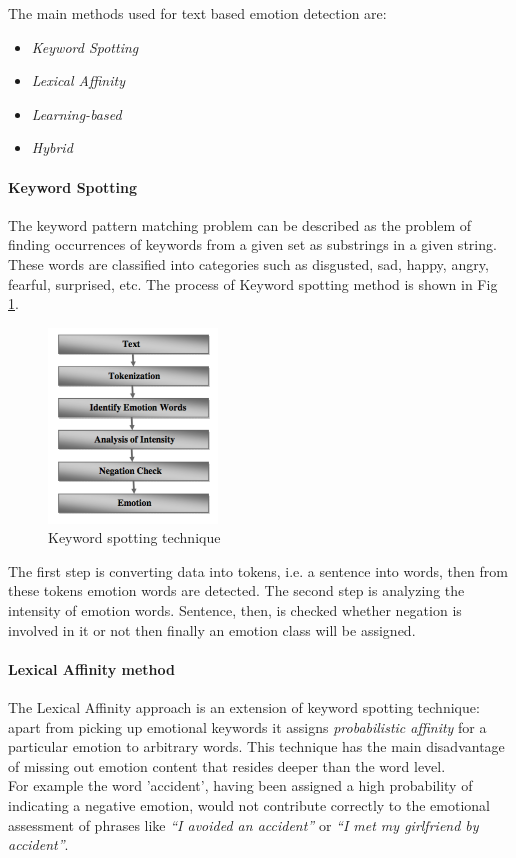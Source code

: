 The main methods used for text based emotion detection are: 
\begin{itemize}
\item \textit{Keyword Spotting}
\item \textit{Lexical Affinity}
\item \textit{Learning-based}
\item \textit{Hybrid}
\end{itemize}

\paragraph{Keyword Spotting}
The keyword pattern matching problem can be described as the problem of finding occurrences of keywords from a given set as substrings in a given string. These words are classified into categories such as disgusted, sad, happy, angry, fearful, surprised, etc. The process of Keyword spotting method is  shown in Fig \ref{fig:keyword_spotting}. 

\begin{figure}[H]
\centering
\includegraphics[width=0.4\textwidth]{./chapters/chapter1/images/keyword_spotting}
\caption{Keyword spotting technique}
\label{fig:keyword_spotting}
\end{figure}

The first step is converting data into tokens, i.e. a sentence into words, then from these tokens emotion words are detected. The second step is analyzing the intensity of emotion words. Sentence, then, is checked whether negation is involved in it or not then finally an emotion class will be assigned.

\paragraph{Lexical Affinity method} 
The Lexical Affinity approach is an extension of keyword spotting technique: apart from picking up emotional keywords it assigns \textit{probabilistic affinity} for a particular emotion to arbitrary words. This technique has the main disadvantage of missing out emotion content that resides deeper than the word level.\\
For example the word 'accident', having been assigned a high probability of indicating a negative emotion, would not contribute correctly to the emotional assessment of phrases like \textit{``I avoided an accident''} or \textit{``I met my girlfriend by accident''}. 

